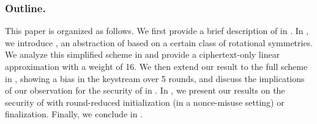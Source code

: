 \subsubsection*{Outline.}
This paper is organized as follows.
We first provide a brief description of \MORUS in .
In , we introduce \MiniMORUS, an abstraction of \MORUS based on a certain class of rotational symmetries.
We analyze this simplified scheme in  and provide a ciphertext-only linear approximation with a weight of 16.
We then extend our result to the full scheme in , showing a bias in the keystream over 5 rounds,
and discuss the implications of our observation for the security of \MORUS in .
In , we present our results on the security of \MORUS with round-reduced initialization (in a nonce-misuse setting) or finalization.
Finally, we conclude in .

